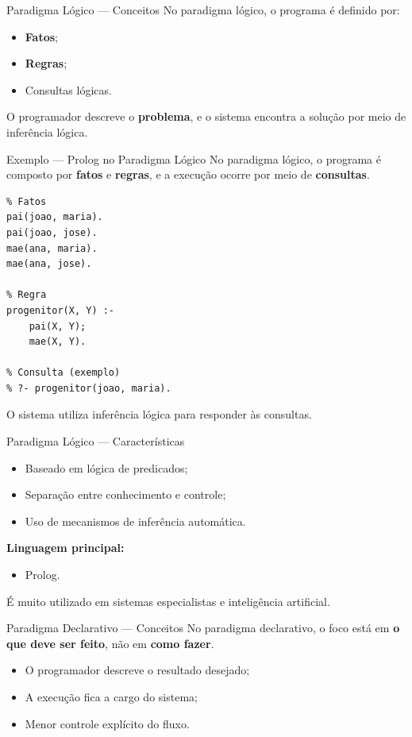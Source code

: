 \documentclass[9pt]{beamer}
\begin{document}
\begin{frame}{Paradigma Lógico — Conceitos}
No paradigma lógico, o programa é definido por:
\begin{itemize}
  \item \textbf{Fatos};
  \item \textbf{Regras};
  \item Consultas lógicas.
\end{itemize}

O programador descreve o \textbf{problema}, e o sistema encontra a solução
por meio de inferência lógica.
\end{frame}
\begin{frame}[fragile]{Exemplo — Prolog no Paradigma Lógico}
No paradigma lógico, o programa é composto por \textbf{fatos} e
\textbf{regras}, e a execução ocorre por meio de \textbf{consultas}.

\begin{verbatim}
% Fatos
pai(joao, maria).
pai(joao, jose).
mae(ana, maria).
mae(ana, jose).

% Regra
progenitor(X, Y) :-
    pai(X, Y);
    mae(X, Y). 

% Consulta (exemplo)
% ?- progenitor(joao, maria).
\end{verbatim}

\small
O sistema utiliza inferência lógica para responder às consultas.
\end{frame}

\begin{frame}{Paradigma Lógico — Características}
\begin{itemize}
  \item Baseado em lógica de predicados;
  \item Separação entre conhecimento e controle;
  \item Uso de mecanismos de inferência automática.
\end{itemize}

\textbf{Linguagem principal:}
\begin{itemize}
  \item Prolog.
\end{itemize}

É muito utilizado em sistemas especialistas e inteligência artificial.
\end{frame}
\begin{frame}{Paradigma Declarativo — Conceitos}
No paradigma declarativo, o foco está em \textbf{o que deve ser feito},
não em \textbf{como fazer}.

\begin{itemize}
  \item O programador descreve o resultado desejado;
  \item A execução fica a cargo do sistema;
  \item Menor controle explícito do fluxo.
\end{itemize}
\end{frame}
\end{document}
